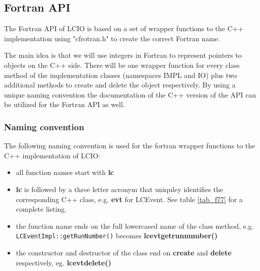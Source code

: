 \subsection{Fortran API}

The Fortran API of LCIO is based on a set of wrapper functions to the 
C++ implementation using "cfrotran.h" to create the correct Fortran name.

The main idea is that we will use integers in Fortran to represent pointers to 
objects on the C++ side. There will be one wrapper function for every class method
of the implementation classes (namespaces IMPL and IO) plus two additional methods 
to create and delete the object respectively.
By using a unique naming convention the documentation of the C++ version of the API
can be utilized for the Fortran API as well.

\subsubsection{Naming convention}
The following naming convention is used for the fortran wrapper functions to the 
C++ implementation of LCIO:
\begin{itemize}
\item{all function names start with {\bf lc}}
\item{{\bf lc} is followed by a three letter acronym that uniquley identifies the 
corresponding C++ class, e.g. {\bf evt} for LCEvent.} See table \ref{tab_f77} for a complete 
listing.

\item{the function name ends on the full lowercased name of the class method, e.g. \\
 \verb$LCEventImpl::getRunNumber()$ becomes  {\bf lcevtgetrunnumber() } }
\item{the constructor and destructor of the class  end on {\bf create} and {\bf delete} 
respectively, eg. {\bf lcevtdelete()} }
\end{itemize}

